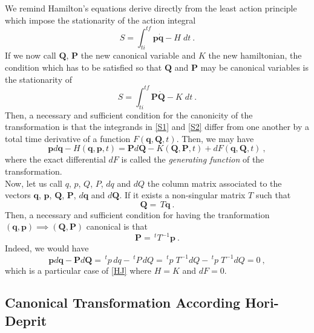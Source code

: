 \documentclass[a4paper]{article}
\begin{document}
\label{HJJ}
We remind Hamilton's equations derive directly from the least action principle which impose the stationarity of the action integral 
\begin{equation}
\label{S1}
S=\int_{ti}^{tf} \mathbf p \mathbf{\dot  q} - H \; dt \ .
\end{equation}
If we now call $\mathbf Q$, $\mathbf P$ the new canonical variable and $K$ the new hamiltonian, the condition which has to be satisfied so that $\mathbf Q$ and $\mathbf P$ may be canonical variables is the stationarity of 
\begin{equation}
\label{S2}
S=\int_{ti}^{tf} \mathbf P \mathbf{\dot  Q} - K \; dt \ .
\end{equation}
Then, a necessary and sufficient condition for the canonicity of the transformation is that the integrands in \eqref{S1} and \eqref{S2} differ from one another by a total time derivative of a function $F(\mathbf q, \mathbf Q, t)$. Then, we may have
\begin{equation}
\label{HJ}
\mathbf p d\mathbf q - H(\mathbf q, \mathbf p, t)=\mathbf P d\mathbf Q - K(\mathbf Q, \mathbf P, t) + dF(\mathbf q, \mathbf Q, t) \ ,
\end{equation}
where the exact differential  $dF$ is called the \textit{generating function} of the transformation. \\
Now, let us call $q$, $p$, $Q$, $P$, $dq$ and $dQ$ the column matrix associated to the vectors $\mathbf q$, $\mathbf p$, $\mathbf Q$, $\mathbf P$, $d \mathbf q$ and $d \mathbf Q$. If it exists a non-singular matrix $T$ such that
\begin{equation}
\mathbf Q= \, T \mathbf q \ .
\end{equation}
Then, a necessary and sufficient condition for having the tranformation $(\mathbf q, \mathbf p) \implies (\mathbf Q, \mathbf P)$ canonical is that
\begin{equation}
\mathbf P= \, ^tT^{-1} \mathbf p \ .
\end{equation}
Indeed, we would have 
\begin{equation}
\mathbf p d\mathbf q - \mathbf P d\mathbf Q = \, ^t  p \, dq - \, ^t  P \, dQ = \, ^t  p \; T^{-1}dQ - \, ^t p \; T^{-1} dQ =0 \ ,
\end{equation}
which is a particular case of \eqref{HJ} where $H=K$ and $dF=0$.


\subsection{Canonical Transformation According Hori-Deprit}
\end{document}
